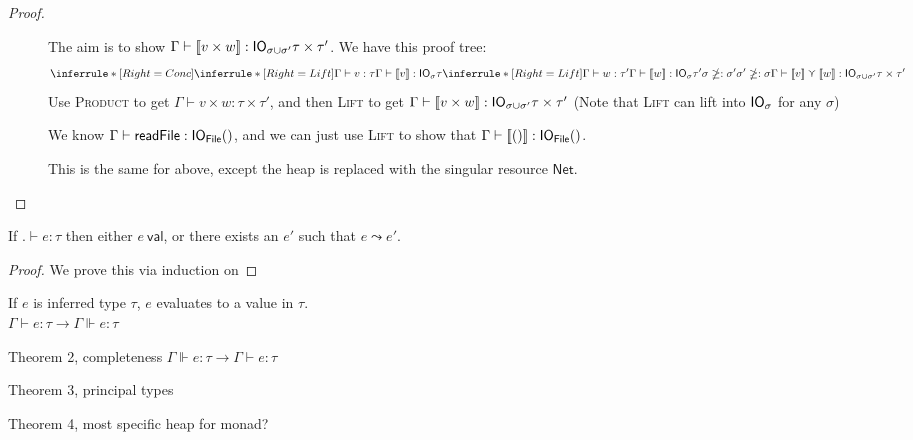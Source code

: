 \begin{proof}
\begin{description}
  \item[]
    The aim is to show $\Gamma \vdash [\![ v \times w]\!] : \mathsf{IO}_{\sigma \cup \sigma'} \tau \times \tau'$.
    We have this proof tree:
    $$\inferrule*[Right=Conc]{
      \inferrule*[Right=Lift]{\Gamma \vdash v : \tau}{\Gamma \vdash \lift{v} : \IO_\sigma \tau} \\
      \inferrule*[Right=Lift]{\Gamma \vdash w : \tau'}{\Gamma \vdash \lift{w} : \IO_\sigma \tau'}
      \\
      \sigma \notsubtyp \sigma' \\ \sigma' \notsubtyp \sigma}
    {\Gamma \vdash \lift{v} \curlyvee \lift{w} : \IO_{\sigma \cup \sigma'} \tau \times \tau'}$$
    Use \textsc{Product} to get $\Gamma \vdash v \times w : \tau \times \tau'$, and then
    \textsc{Lift} to get $\Gamma \vdash [\![ v \times w]\!] : \mathsf{IO}_{\sigma \cup \sigma'} \tau \times \tau'$
    (Note that \textsc{Lift} can lift into $\mathsf{IO}_\sigma$ for any $\sigma$)

  \item[\textmd{}]
    We know $\Gamma \vdash
    \textsf{readFile} : \mathsf{IO}_{\textsf{File}} ()$, and we can just use
    \textsc{Lift} to show that $\Gamma \vdash [\![()]\!] : \mathsf{IO}_{\textsf{File}}
    ()$.
  \item[\textmd{}]
    This is the same for above, except the heap is replaced with the
    singular resource $\textsf{Net}$.
  \end{description}
\end{proof}

\begin{theorem}[Progress]
  If $. \vdash e : \tau$ then either $e \ \textsf{val}$, or there exists an $e'$
  such that $e \leadsto e'$.
\end{theorem}

\begin{proof}
  We prove this via induction on 
\end{proof}


\begin{theorem}[Soundness]
  If $e$ is inferred type $\tau$, $e$ evaluates to a value in $\tau$. \\
  $\Gamma \vdash e : \tau \rightarrow \Gamma \Vdash e : \tau$
\end{theorem}


Theorem 2, completeness $\Gamma \Vdash e : \tau \rightarrow \Gamma \vdash e : \tau$

Theorem 3, principal types

Theorem 4, most specific heap for monad?
